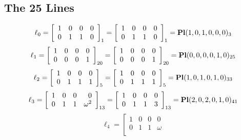 \documentclass{article}
\begin{document}
{\subsection*{The 25 Lines}
$$
\ell_{0} = 
\left[
\begin{array}{*{4}{r}}
1 & 0 & 0 & 0\\
0 & 1 & 1 & 0\\
\end{array}
\right]
_{1}
=
\left[
\begin{array}{*{4}c}
1  & 0  & 0  & 0\\
0  & 1  & 1  & 0\\
\end{array}
\right]_{1}
={\rm\bf Pl}(1,0,1,0,0,0 )_{3}$$
$$
\ell_{1} = 
\left[
\begin{array}{*{4}{r}}
1 & 0 & 0 & 0\\
0 & 0 & 0 & 1\\
\end{array}
\right]
_{20}
=
\left[
\begin{array}{*{4}c}
1  & 0  & 0  & 0\\
0  & 0  & 0  & 1\\
\end{array}
\right]_{20}
={\rm\bf Pl}(0,0,0,0,1,0 )_{25}$$
$$
\ell_{2} = 
\left[
\begin{array}{*{4}{r}}
1 & 0 & 0 & 0\\
0 & 1 & 1 & 1\\
\end{array}
\right]
_{5}
=
\left[
\begin{array}{*{4}c}
1  & 0  & 0  & 0\\
0  & 1  & 1  & 1\\
\end{array}
\right]_{5}
={\rm\bf Pl}(1,0,1,0,1,0 )_{33}$$
$$
\ell_{3} = 
\left[
\begin{array}{*{4}{r}}
1 & 0 & 0 & 0\\
0 & 1 & 1 & \omega^{2}\\
\end{array}
\right]
_{13}
=
\left[
\begin{array}{*{4}c}
1  & 0  & 0  & 0\\
0  & 1  & 1  & 3\\
\end{array}
\right]_{13}
={\rm\bf Pl}(2,0,2,0,1,0 )_{41}$$
$$
\ell_{4} = 
\left[
\begin{array}{*{4}{r}}
1 & 0 & 0 & 0\\
0 & 1 & 1 & \omega \\
\end{array}
$$}
\end{document}
